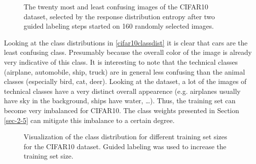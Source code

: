\documentclass[10pt,twocolumn,letterpaper]{article}
\begin{document}
\begin{figure}[pt]

  \caption{The twenty most and least confusing images of the CIFAR10
    dataset, selected by the response distribution entropy after two
    guided labeling steps started on 160 randomly selected
    images.\label{cifar10selected}}
\end{figure}

Looking at the class distributions in \autoref{cifar10classdist} it is
clear that cars are the least confusing class. Presumably because the
overall color of the image is already very indicative of this class.
It is interesting to note that the technical classes (airplane,
automobile, ship, truck) are in general less confusing than the animal
classes (especially bird, cat, deer). Looking at the dataset, a lot of
the images of technical classes have a very distinct overall
appearence (e.g. airplanes usually have sky in the background, ships
have water, \dots). Thus, the training set can become very imbalanced
for CIFAR10. The class weights presented in Section \ref{sec-2-5} can
mitigate this imbalance to a certain degree.

\begin{figure}
  \centering
  
  \caption{Visualization of the class distribution for different
    training set sizes for the CIFAR10 dataset. Guided labeling was
    used to increase the training set size.\label{cifar10classdist}}
\end{figure}
\end{document}
